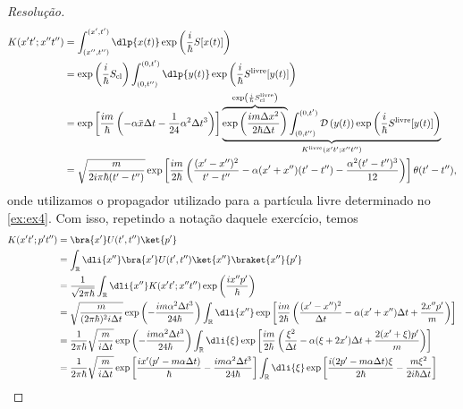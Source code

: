\begin{proof}[Resolução]
   \begin{align*}
      K(x't'; x''t'') &= \int_{(x'', t'')}^{(x', t')} \dlp{x(t)} \exp\left(\frac{i}{\hbar} S[x(t)]\right)\\
                      &= \exp\left(\frac{i}{\hbar}S_{\mathrm{cl}}\right)\int_{(0,t'')}^{(0,t')} \dlp{y(t)} \exp\left(\frac{i}{\hbar} S^{\mathrm{livre}}[y(t)]\right)\\
                      &= \exp\left[\frac{im}{\hbar}\left(-\alpha \bar{x} \Delta t - \frac1{24} \alpha^2 \Delta t^3\right)\right] \underbrace{\overbrace{\exp\left(\frac{im\Delta x^2}{2 \hbar \Delta t}\right)}^{\exp\left(\frac{i}{\hbar}S_{\mathrm{cl}}^{\mathrm{livre}}\right)} \int_{(0, t'')}^{(0, t')} \mathcal{D}\left(y(t)\right) \exp\left(\frac{i}{\hbar}S^{\mathrm{livre}}[y(t)]\right)}_{K^{\mathrm{livre}}(x't'; x''t'')}\\
                      &= \sqrt{\frac{m}{2i\pi \hbar (t' - t'')}}\exp\left[\frac{im}{2\hbar}\left(\frac{(x' - x'')^2}{t' - t''} - \alpha (x' + x'')(t' - t'') - \frac{\alpha^2 (t' - t'')^3}{12}\right)\right]\theta(t' - t''),
   \end{align*}
   onde utilizamos o propagador utilizado para a partícula livre determinado no \cref{ex:ex4}. Com isso, repetindo a notação daquele exercício, temos
   \begin{align*}
      K(x't'; p't'') &= \bra{x'}U(t', t'')\ket{p'}\\
                      &= \int_{\mathbb{R}} \dli{x''} \bra{x'}U(t', t'')\ket{x''}\braket{x''}{p'}\\
                      &= \frac{1}{\sqrt{2 \pi \hbar}} \int_{\mathbb{R}}\dli{x''} K(x't'; x''t'') \exp\left(\frac{i x'' p'}{\hbar}\right)\\
                      &= \sqrt{\frac{m}{(2\pi \hbar)^2 i \Delta t}}\exp\left(-\frac{i m \alpha^2 \Delta t^3}{24 \hbar}\right) \int_{\mathbb{R}} \dli{x''} \exp\left[\frac{i m}{2\hbar}\left(\frac{(x'- x'')^2}{\Delta t} - \alpha (x' + x'') \Delta t + \frac{2x'' p'}{m}\right)\right]\\
                      &= \frac1{2\pi \hbar}\sqrt{\frac{m}{i \Delta t}}\exp\left(-\frac{i m \alpha^2 \Delta t^3}{24 \hbar}\right) \int_{\mathbb{R}} \dli{\xi} \exp\left[\frac{i m}{2\hbar}\left(\frac{\xi^2}{\Delta t} - \alpha (\xi + 2x') \Delta t + \frac{2(x'+\xi) p'}{m}\right)\right]\\
                      &= \frac{1}{2\pi \hbar}\sqrt{\frac{m}{ i \Delta t}}\exp\left[\frac{i x' (p' - m \alpha \Delta t)}{\hbar} - \frac{i m \alpha^2 \Delta t^3}{24 \hbar}\right] \int_{\mathbb{R}} \dli{\xi} \exp\left[\frac{i (2p' - m \alpha \Delta t) \xi}{2 \hbar} - \frac{m\xi^2}{2i \hbar\Delta t}\right]\\

\end{align*}
\end{proof}
